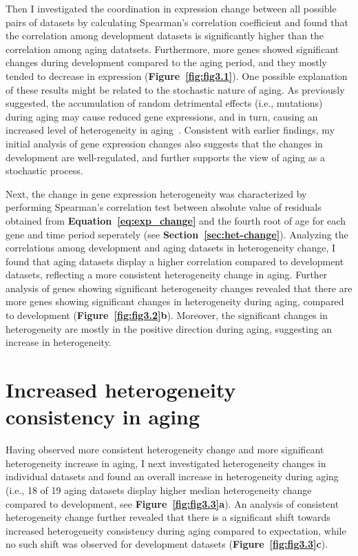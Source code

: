 Then I investigated the coordination in expression change between all possible pairs of datasets by calculating Spearman's correlation coefficient 
and found that the correlation among development datasets is significantly higher than the correlation among aging datatsets.
Furthermore, more genes showed significant changes during development compared to the aging period, and they mostly tended to decrease in expression (\textbf{Figure~\ref{fig:fig3.1}}).
One possible explanation of these results might be related to the stochastic nature of aging. 
As previously suggested, the accumulation of random detrimental effects (i.e., mutations) during aging may cause reduced gene expressions, 
and in turn, causing an increased level of heterogeneity in aging~\autocite{Lu2004}.
Consistent with earlier findings, my initial analysis of gene expression changes also suggests that the changes in development are well-regulated,
and further supports the view of aging as a stochastic process.

Next, the change in gene expression heterogeneity was characterized 
by performing Spearman's correlation test between absolute value of residuals obtained from \textbf{Equation~\ref{eq:exp_change}} 
and the fourth root of age for each gene and time period seperately (see \textbf{Section~\ref{sec:het-change}}).
Analyzing the correlations among development and aging datasets in heterogeneity change,
I found that aging datasets display a higher correlation compared to development datasets, 
reflecting a more consistent heterogeneity change in aging.
Further analysis of genes showing significant heterogeneity changes revealed that 
there are more genes showing significant changes in heterogeneity during aging, compared to development (\textbf{Figure~\ref{fig:fig3.2}b}). 
Moreover, the significant changes in heterogeneity are mostly in the positive direction during aging, suggesting an increase in heterogeneity.

\section{Increased heterogeneity consistency in aging}
Having observed more consistent heterogeneity change and more significant heterogeneity increase in aging, 
I next investigated heterogeneity changes in individual datasets and found an overall increase in heterogeneity during aging 
(i.e., 18 of 19 aging datasets display higher median heterogeneity change compared to development, see \textbf{Figure~\ref{fig:fig3.3}a}). 
An analysis of consistent heterogeneity change further revealed that there is a significant shift towards increased heterogeneity consistency during aging compared to expectation,
while no such shift was observed for development datasets (\textbf{Figure~\ref{fig:fig3.3}c}).

